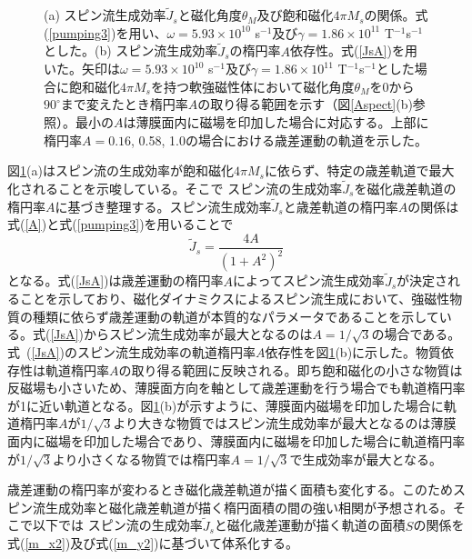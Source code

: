 \begin{figure}[tbp]
\begin{center}
\caption{(a) スピン流生成効率${\tilde J}_s$と磁化角度$\theta_M$及び飽和磁化$4\pi M_s $の関係。式(\ref{pumping3})を用い、$\omega=5.93\times 10^{10}$ s$^{-1}$及び$\gamma=1.86\times 10^{11}$ T$^{-1}$s$^{-1}$とした。(b) スピン流生成効率${\tilde J}_s$の楕円率$A$依存性。式(\ref{JsA})を用いた。矢印は$\omega=5.93\times 10^{10}$ s$^{-1}$及び$\gamma=1.86\times 10^{11}$ T$^{-1}$s$^{-1}$とした場合に飽和磁化$4\pi M_s$を持つ軟強磁性体において磁化角度$\theta_M$を0から$90^\circ$まで変えたとき楕円率$A$の取り得る範囲を示す（図\ref{Aspect}(b)参照）。最小の$A$は薄膜面内に磁場を印加した場合に対応する。上部に楕円率$A=0.16$, 0.58, 1.0の場合における歳差運動の軌道を示した。}
\label{pumping_M}
\end{center}
\end{figure}




図\ref{pumping_M}(a)はスピン流の生成効率が飽和磁化$4\pi M_s$に依らず、特定の歳差軌道で最大化されることを示唆している。そこで
スピン流の生成効率${\tilde J}_s$を磁化歳差軌道の楕円率$A$に基づき整理する。スピン流生成効率${\tilde J}_s$と歳差軌道の楕円率$A$の関係は式(\ref{A})と式(\ref{pumping3})を用いることで
\begin{equation}
{\tilde J}_s=\frac{4 A}{\left(1+A^2\right)^2}\label{JsA}
\end{equation}
となる。式(\ref{JsA})は歳差運動の楕円率$A$によってスピン流生成効率${\tilde J}_s$が決定されることを示しており、磁化ダイナミクスによるスピン流生成において、強磁性物質の種類に依らず歳差運動の軌道が本質的なパラメータであることを示している。式(\ref{JsA})からスピン流生成効率が最大となるのは$A=1/\sqrt{3}$の場合である。
式~(\ref{JsA})のスピン流生成効率の軌道楕円率$A$依存性を図\ref{pumping_M}(b)に示した。物質依存性は軌道楕円率$A$の取り得る範囲に反映される。即ち飽和磁化の小さな物質は反磁場も小さいため、薄膜面方向を軸として歳差運動を行う場合でも軌道楕円率が1に近い軌道となる。図\ref{pumping_M}(b)が示すように、薄膜面内磁場を印加した場合に軌道楕円率$A$が$1/\sqrt{3}$より大きな物質ではスピン流生成効率が最大となるのは薄膜面内に磁場を印加した場合であり、薄膜面内に磁場を印加した場合に軌道楕円率が$1/\sqrt{3}$より小さくなる物質では楕円率$A=1/\sqrt{3}$で生成効率が最大となる。






歳差運動の楕円率が変わるとき磁化歳差軌道が描く面積も変化する。このためスピン流生成効率と磁化歳差軌道が描く楕円面積の間の強い相関が予想される。そこで以下では
スピン流の生成効率${\tilde J}_s$と磁化歳差運動が描く軌道の面積$S$の関係を式(\ref{m_x2})及び式(\ref{m_y2})に基づいて体系化する。

